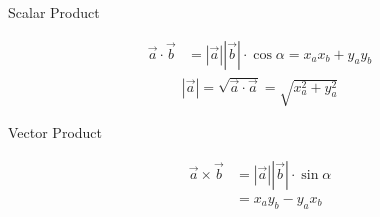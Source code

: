 \documentclass[10pt]{beamer}
\begin{document}
\begin{frame}{Scalar Product}
		\begin{figure}[h]
		\end{figure}
		\begin{align*}
				\overrightarrow{a} \cdot \overrightarrow{b} & = |\overrightarrow{a}||\overrightarrow{b}|\cdot\cos\alpha 
				= x_a x_b + y_a y_b 
		\end{align*}
		\begin{align*}
				|\overrightarrow{a}| = \sqrt{\overrightarrow{a} \cdot \overrightarrow{a}} = \sqrt{x_a^2 + y_a^2}
		\end{align*}
\end{frame}

\begin{frame}{Vector Product}
		\begin{figure}[h]
		\end{figure}
		\begin{align*}
				\overrightarrow{a} \times \overrightarrow{b} & = |\overrightarrow{a}||\overrightarrow{b}|\cdot\sin\alpha \\
				& = x_a y_b  - y_a x_b  
		\end{align*}
\end{frame}
\end{document}
